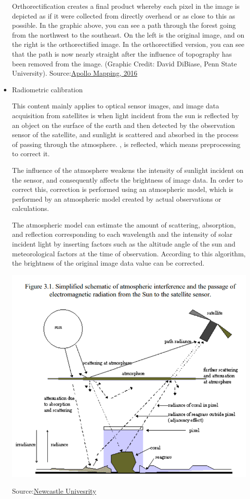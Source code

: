\documentclass[
  letterpaper,
  DIV=11,
  numbers=noendperiod]{scrreprt}
\begin{document}
\begin{itemize}
  Orthorectification creates a final product whereby each pixel in the
  image is depicted as if it were collected from directly overhead or as
  close to this as possible. In the graphic above, you can see a path
  through the forest going from the northwest to the southeast. On the
  left is the original image, and on the right is the orthorectified
  image. In the orthorectified version, you can see that the path is now
  nearly straight after the influence of topography has been removed
  from the image. (Graphic Credit: David DiBiase, Penn State
  University).
  Source:\href{https://apollomapping.com/blog/g-faq-orthorectification-part}{Apollo
  Mapping, 2016}
\item
  Radiometric calibration

  This content mainly applies to optical sensor images, and image data
  acquisition from satellites is when light incident from the sun is
  reflected by an object on the surface of the earth and then detected
  by the observation sensor of the satellite, and sunlight is scattered
  and absorbed in the process of passing through the atmosphere. , is
  reflected, which means preprocessing to correct it.

  The influence of the atmosphere weakens the intensity of sunlight
  incident on the sensor, and consequently affects the brightness of
  image data. In order to correct this, correction is performed using an
  atmospheric model, which is performed by an atmospheric model created
  by actual observations or calculations.

  The atmospheric model can estimate the amount of scattering,
  absorption, and reflection corresponding to each wavelength and the
  intensity of solar incident light by inserting factors such as the
  altitude angle of the sun and meteorological factors at the time of
  observation. According to this algorithm, the brightness of the
  original image data value can be corrected.

  \includegraphics{./images/paste-F675F01F.png}

  Source:\href{https://www.ncl.ac.uk/tcmweb/bilko/module7/lesson3.pdf}{Newcastle
  Univesrity}
\end{itemize}
\end{document}
